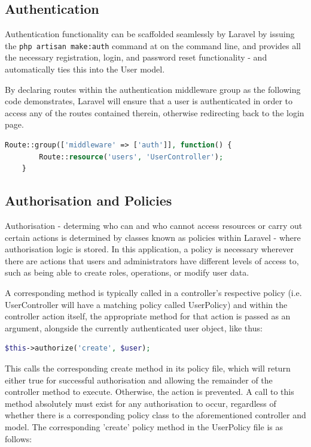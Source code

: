 \subsection{Authentication}
Authentication functionality can be scaffolded seamlessly by Laravel by issuing the \texttt{php artisan make:auth} command at on the command line, and provides all the necessary registration, login, and password reset functionality - and automatically ties this into the User model.

By declaring routes within the authentication middleware group as the following code demonstrates, Laravel will ensure that a user is authenticated in order to access any of the routes contained therein, otherwise redirecting back to the login page. \cite{Laravel8}

\begin{lstlisting}[language=PHP, breaklines]
    Route::group(['middleware' => ['auth']], function() {
        Route::resource('users', 'UserController');
    }
\end{lstlisting}

\subsection{Authorisation and Policies}
Authorisation - determing who can and who cannot access resources or carry out certain actions is determined by classes known as policies within Laravel - where authorisation logic is stored. \cite{Larashout1} In this application, a policy is necessary wherever there are actions that users and administrators have different levels of access to, such as being able to create roles, operations, or modify user data.

A corresponding method is typically called in a controller's respective policy (i.e. UserController will have a matching policy called UserPolicy) and within the controller action itself, the appropriate method for that action is passed as an argument, alongside the currently authenticated user object, like thus:

\begin{lstlisting}[language=PHP, breaklines]
    $this->authorize('create', $user);
\end{lstlisting}

This calls the corresponding create method in its policy file, which will return either true for successful authorisation and allowing the remainder of the controller method to execute. Otherwise, the action is prevented. A call to this method absolutely must exist for any authorisation to occur, regardless of whether there is a corresponding policy class to the aforementioned controller and model. The corresponding 'create' policy method in the UserPolicy file is as follows:

